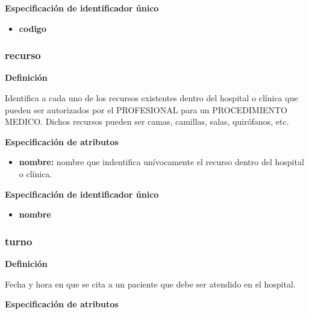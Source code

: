 \documentclass[a4paper,11pt]{article}
\begin{document}
\textbf{Especificación de identificador único}

\begin{itemize}

     \item \textbf{codigo}

\end{itemize}

\subsubsection{\textbf{recurso}}

\textbf{Definición}

Identifica a cada uno de los recursos existentes dentro del hospital o clínica
que pueden ser autorizados por el PROFESIONAL para un PROCEDIMIENTO MEDICO.
Dichos recursos pueden ser camas, camillas, salas, quirófanos, etc.

\textbf{Especificación de atributos}

\begin{itemize}

     \item \textbf{nombre:} nombre que indentifica unívocamente el recurso dentro del hospital o clínica.

\end{itemize}

\textbf{Especificación de identificador único}

\begin{itemize}

     \item \textbf{nombre}

\end{itemize}

\subsubsection{\textbf{turno}}

\textbf{Definición}

Fecha y hora en que se cita a un paciente que debe ser atendido en el hospital.

\textbf{Especificación de atributos}
\end{document}
